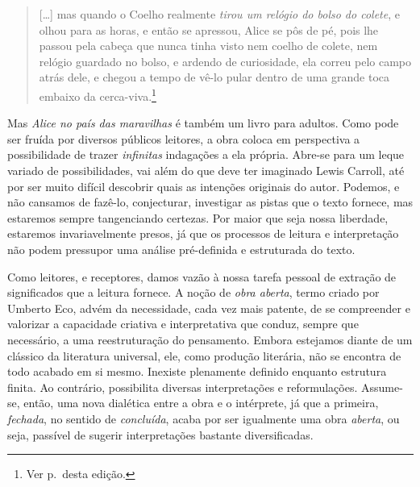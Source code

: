 \begin{quote}
{[}\ldots{}{]} mas quando o Coelho
realmente \emph{tirou um relógio do bolso do colete}, e olhou para as
horas, e então se apressou, Alice se pôs de pé, pois lhe passou pela
cabeça que nunca tinha visto nem coelho de colete, nem relógio guardado
no bolso, e ardendo de curiosidade, ela correu pelo campo atrás dele, e
chegou a tempo de vê-lo pular dentro de uma grande toca embaixo da
cerca-viva.\footnote{Ver p.\,\pageref{ref2} desta edição.}
\end{quote}


Mas \emph{Alice no país das maravilhas} é também um livro para adultos.
Como pode ser fruída por diversos públicos leitores, a obra coloca em
perspectiva a possibilidade de trazer \textit{infinitas} indagações a ela
própria. Abre-se para um leque variado de possibilidades, vai além do
que deve ter imaginado Lewis Carroll, até por ser muito difícil
descobrir quais as intenções originais do autor. Podemos, e não cansamos
de fazê-lo, conjecturar, investigar as pistas que o texto fornece, mas
estaremos sempre tangenciando certezas. Por maior que seja nossa
liberdade, estaremos invariavelmente presos, já que os processos de
leitura e interpretação não podem pressupor uma análise pré-definida e
estruturada do texto.

Como leitores, e receptores, damos vazão à nossa
tarefa pessoal de extração de significados que a leitura fornece. A
noção de \emph{obra aberta}, termo criado por Umberto Eco, advém
da necessidade, cada vez mais patente, de se compreender e valorizar a
capacidade criativa e interpretativa que conduz, sempre que necessário,
a uma reestruturação do pensamento. Embora estejamos diante de um
clássico da literatura universal, ele, como produção literária, não se
encontra de todo acabado em si mesmo. Inexiste plenamente definido
enquanto estrutura finita.
Ao contrário, possibilita diversas interpretações e reformulações.
Assume-se, então, uma nova dialética entre a obra e o intérprete, já que
a primeira, \emph{fechada}, no sentido de \emph{concluída},
acaba por ser igualmente uma obra \emph{aberta}, ou seja, passível de
sugerir interpretações bastante diversificadas.

